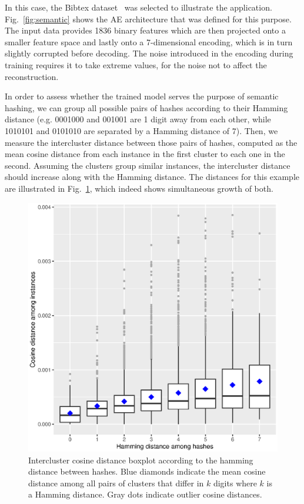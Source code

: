 In this case, the Bibtex dataset~ was selected to illustrate the application. Fig.~\ref{fig:semantic} shows the AE architecture that was defined for this purpose. The input data provides 1836 binary features which are then projected onto a smaller feature space and lastly onto a 7-dimensional encoding, which is in turn slightly corrupted before decoding. The noise introduced in the encoding during training requires it to take extreme values, for the noise not to affect the reconstruction.

In order to assess whether the trained model serves the purpose of semantic hashing, we can group all possible pairs of hashes according to their Hamming distance (e.g. 0001000 and 001001 are 1 digit away from each other, while 1010101 and 0101010 are separated by a Hamming distance of 7). Then, we measure the intercluster distance between those pairs of hashes, computed as the mean cosine distance from each instance in the first cluster to each one in the second. Assuming the clusters group similar instances, the intercluster distance should increase along with the Hamming distance. The distances for this example are illustrated in Fig.~\ref{fig:hashingplot}, which indeed shows simultaneous growth of both.

\begin{figure}[ht!]
    \centering
    \includegraphics[width=\linewidth]{hashing_intercluster.eps}
    \caption[Intercluster cosine distance boxplot according to the hamming distance between hashes.]{\label{fig:hashingplot}Intercluster cosine distance boxplot according to the hamming distance between hashes. Blue diamonds indicate the mean cosine distance among all pairs of clusters that differ in $k$ digits where $k$ is a Hamming distance. Gray dots indicate outlier cosine distances.}
\end{figure}

